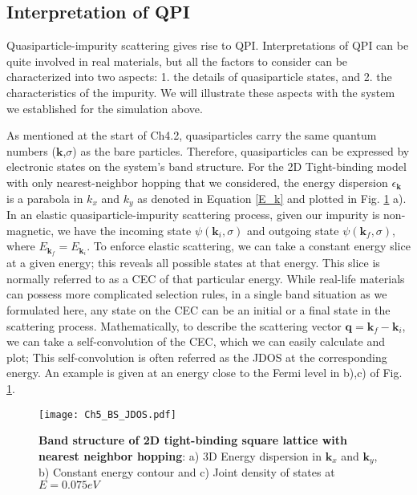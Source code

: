 \subsection{Interpretation of QPI}\label{subsection: interpretationQPI}
Quasiparticle-impurity scattering gives rise to \ac{QPI}. Interpretations of \ac{QPI} can be quite involved in real materials, but all the factors to consider can be characterized into two aspects: 1. the details of quasiparticle states, and 2. the characteristics of the impurity. We will illustrate these aspects with the system we established for the simulation above. 

As mentioned at the start of Ch4.2, quasiparticles carry the same quantum numbers ($\textbf{k}$,$\sigma$) as the bare particles. Therefore, quasiparticles can be expressed by electronic states on the system's band structure. For the 2D Tight-binding model with only nearest-neighbor hopping that we considered, the energy dispersion $\epsilon_{\mathbf{k}}$ is a parabola in $k_x$ and $k_y$ as denoted in Equation \ref{E_k} and plotted in Fig. \ref{fig:ch5_bs} a). In an elastic quasiparticle-impurity scattering process, given our impurity is non-magnetic, we have the incoming state $\psi(\textbf{k}_i,\sigma)$ and outgoing state $\psi(\textbf{k}_f,\sigma)$, where $E_{\textbf{k}_f} = E_{\textbf{k}_i}$. To enforce elastic scattering, we can take a constant energy slice at a given energy; this reveals all possible states at that energy. This slice is normally referred to as a \ac{CEC} of that particular energy. While real-life materials can possess more complicated selection rules, in a single band situation as we formulated here, any state on the \ac{CEC} can be an initial or a final state in the scattering process. Mathematically, to describe the scattering vector $\textbf{q} = \textbf{k}_f -\textbf{k}_i$, we can take a self-convolution of the \ac{CEC}, which we can easily calculate and plot; This self-convolution is often referred as the \ac{JDOS} at the corresponding energy. An example is given at an energy close to the Fermi level in b),c) of Fig. \ref{fig:ch5_bs}. 
\begin{figure}
	\centering
	\texttt{[image: Ch5\_BS\_JDOS.pdf]} 
	\caption[\textbf{Band structure of 2D tight-binding square lattice}]{\textbf{Band structure of 2D tight-binding square lattice with nearest neighbor hopping}: a) 3D Energy dispersion in $\textbf{k}_x$ and $\textbf{k}_y$, b) Constant energy contour and c) Joint density of states at $E=0.075eV$}
	\label{fig:ch5_bs}
\end{figure}

